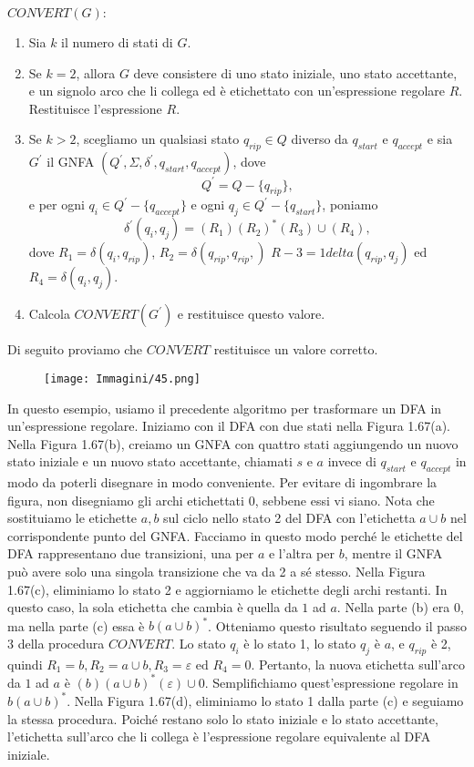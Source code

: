\documentclass{article}
\begin{document}
$CONVERT(G):$
\begin{enumerate}
    \item Sia $k$ il numero di stati di $G$.
    \item Se $k = 2$, allora $G$ deve consistere di uno stato iniziale, uno stato accettante, e un signolo arco che li collega ed è etichettato con un'espressione regolare $R$. Restituisce l'espressione $R$.
    \item Se $k > 2$, scegliamo un qualsiasi stato $q_{rip} \in Q$ diverso da $q_{start}$ e $q_{accept}$ e sia $G^{'}$ il GNFA $(Q^{'},\Sigma,\delta^{'},q_{start},q_{accept})$, dove $$Q^{'} = Q - \{q_{rip}\},$$ e per ogni $q_i \in Q^{'} - \{q_{accept}\}$ e ogni $q_j \in Q^{'} - \{q_{start}\}$, poniamo $$ \delta^{'}(q_i,q_j) = (R_1)(R_2)^{*}(R_3) \cup (R_4),$$ dove $R_1 = \delta(q_i,q_{rip})$, $R_2 = \delta(q_{rip},q_{rip},)$ $R-3 = 1delta(q_{rip},q_j)$ ed $R_4 = \delta (q_i,q_j)$.
    \item Calcola $CONVERT(G^{'})$ e restituisce questo valore. 
\end{enumerate}

Di seguito proviamo che $CONVERT$ restituisce un valore corretto.

\begin{figure}[H]
    \centering
    \texttt{[image: Immagini/45.png]}
    \label{fig:nuova_immagine}
\end{figure}

\begin{tcolorbox}[colback=yellow!10!white, colframe=yellow!50!black, title=Esempio 1.66]
    In questo esempio, usiamo il precedente algoritmo per trasformare un DFA in un'espressione regolare. Iniziamo con il DFA con due stati nella Figura 1.67(a).
Nella Figura 1.67(b), creiamo un GNFA con quattro stati aggiungendo un nuovo stato iniziale e un nuovo stato accettante, chiamati $s$ e $a$ invece di $q_{start}$ e $q_{accept}$ in modo da poterli disegnare in modo conveniente. Per evitare di ingombrare la figura, non disegniamo gli archi etichettati $0$, sebbene essi vi siano. Nota che sostituiamo le etichette $a,b$ sul ciclo nello stato 2 del DFA con l'etichetta $a\cup b$ nel corrispondente punto del GNFA. Facciamo in questo modo perché le etichette del DFA rappresentano due transizioni, una per $a$ e l'altra per $b$, mentre il GNFA può avere solo una singola transizione che va da 2 a sé stesso.
Nella Figura 1.67(c), eliminiamo lo stato 2 e aggiorniamo le etichette degli archi restanti. In questo caso, la sola etichetta che cambia è quella da $1$ ad $a$. Nella parte (b) era $0$, ma nella parte (c) essa è $b(a\cup b)^{*}$. Otteniamo questo risultato seguendo il passo 3 della procedura $CONVERT$. Lo stato $q_{i}$ è lo stato 1, lo stato $q_{j}$ è $a$, e $q_{rip}$ è 2, quindi $R_{1} = b, R_{2} = a\cup b, R_{3} = \varepsilon \text{ ed } R_{4} = 0$. Pertanto, la nuova etichetta sull'arco da $1$ ad $a$ è $(b)(a\cup b)^{*}(\varepsilon) \cup 0$. Semplifichiamo quest'espressione regolare in $b(a \cup b)^{*}$. Nella Figura 1.67(d), eliminiamo lo stato 1 dalla parte (c) e seguiamo la stessa procedura. Poiché restano solo lo stato iniziale e lo stato accettante, l'etichetta sull'arco che li collega è l'espressione regolare equivalente al DFA iniziale.
\end{tcolorbox}
\end{document}
